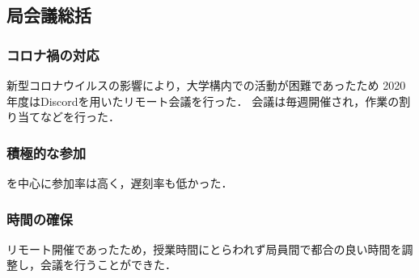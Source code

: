 \subsection*{局会議総括}

\subsubsection*{コロナ禍の対応}

新型コロナウイルスの影響により，大学構内での活動が困難であったため
2020年度はDiscordを用いたリモート会議を行った．
会議は毎週開催され，作業の割り当てなどを行った．

\subsubsection*{積極的な参加}

\secondGrade{}を中心に参加率は高く，遅刻率も低かった．

\subsubsection*{時間の確保}

リモート開催であったため，授業時間にとらわれず局員間で都合の良い時間を調整し，会議を行うことができた．
